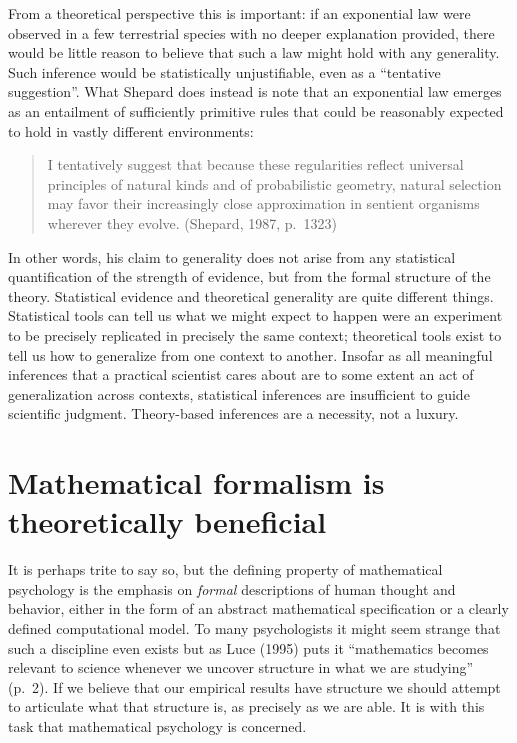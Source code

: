\documentclass[
  english,
  doc]{apa6}
\begin{document}
From a theoretical perspective this is important: if an exponential law were observed in a few terrestrial species with no deeper explanation provided, there would be little reason to believe that such a law might hold with any generality. Such inference would be statistically unjustifiable, even as a \enquote{tentative suggestion}. What Shepard does instead is note that an exponential law emerges as an entailment of sufficiently primitive rules that could be reasonably expected to hold in vastly different environments:

\begin{quote}
I tentatively suggest that because these regularities reflect universal principles of natural kinds and of probabilistic geometry, natural selection may favor their increasingly close approximation in sentient organisms wherever they evolve. (Shepard, 1987, p.~1323)
\end{quote}

\noindent
In other words, his claim to generality does not arise from any statistical quantification of the strength of evidence, but from the formal structure of the theory. Statistical evidence and theoretical generality are quite different things. Statistical tools can tell us what we might expect to happen were an experiment to be precisely replicated in precisely the same context; theoretical tools exist to tell us how to generalize from one context to another. Insofar as all meaningful inferences that a practical scientist cares about are to some extent an act of generalization across contexts, statistical inferences are insufficient to guide scientific judgment. Theory-based inferences are a necessity, not a luxury.

\hypertarget{mathematical-formalism-is-theoretically-beneficial}{%
\section{Mathematical formalism is theoretically beneficial}\label{mathematical-formalism-is-theoretically-beneficial}}

\noindent
It is perhaps trite to say so, but the defining property of mathematical psychology is the emphasis on \emph{formal} descriptions of human thought and behavior, either in the form of an abstract mathematical specification or a clearly defined computational model. To many psychologists it might seem strange that such a discipline even exists but as Luce (1995) puts it \enquote{mathematics becomes relevant to science whenever we uncover structure in what we are studying} (p.~2). If we believe that our empirical results have structure we should attempt to articulate what that structure is, as precisely as we are able. It is with this task that mathematical psychology is concerned.
\end{document}
